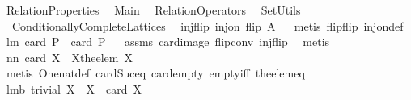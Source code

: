 %
\begin{isabellebody}%
\def\isabellecontext{RelationProperties}%
%
\isamarkuptrue%
%
\isadelimtheory
%
\endisadelimtheory
%
\isatagtheory
{}\isamarkupfalse%
\ RelationProperties\isanewline
{}\isanewline
\ \ Main\isanewline
\ \ RelationOperators\isanewline
\ \ SetUtils\isanewline
\ \ Conditionally{\isacharunderscore}Complete{\isacharunderscore}Lattices\ \isanewline
\isanewline
{}%
\endisatagtheory
{\isafoldtheory}%
%
\isadelimtheory
%
\endisadelimtheory
%
\isamarkuptrue%
\isamarkupfalse%
\ injflip{\isacharcolon}\ {\isachardoublequoteopen}inj{\isacharunderscore}on\ flip\ A{\isachardoublequoteclose}%
\isadelimproof
\ %
\endisadelimproof
%
\isatagproof
{}\isamarkupfalse%
\ {\isacharparenleft}metis\ flip{\isacharunderscore}flip\ inj{\isacharunderscore}on{\isacharunderscore}def{\isacharparenright}%
\endisatagproof
{\isafoldproof}%
%
\isadelimproof
%
\endisadelimproof
\isanewline
\isanewline
{}\isamarkupfalse%
\ lm{}{}{}{\isacharcolon}\ {\isachardoublequoteopen}card\ P\ {\isacharequal}\ card\ {\isacharparenleft}P{\isacharcircum}{\isacharminus}{}{\isacharparenright}{\isachardoublequoteclose}%
\isadelimproof
\ %
\endisadelimproof
%
\isatagproof
{}\isamarkupfalse%
\ assms\ card{\isacharunderscore}image\ flip{\isacharunderscore}conv\ injflip\ \isamarkupfalse%
\ metis%
\endisatagproof
{\isafoldproof}%
%
\isadelimproof
%
\endisadelimproof
\isanewline
\isanewline
{}\isamarkupfalse%
\ nn{}{}{\isacharcolon}\ {\isachardoublequoteopen}card\ X{\isacharequal}{}\ {\isacharequal}\ {\isacharparenleft}X{\isacharequal}{\isacharbraceleft}the{\isacharunderscore}elem\ X{\isacharbraceright}{\isacharparenright}{\isachardoublequoteclose}\ \isanewline
%
\isadelimproof
%
\endisadelimproof
%
\isatagproof
{}\isamarkupfalse%
\ {\isacharparenleft}metis\ One{\isacharunderscore}nat{\isacharunderscore}def\ card{\isacharunderscore}Suc{\isacharunderscore}eq\ card{\isacharunderscore}empty\ empty{\isacharunderscore}iff\ the{\isacharunderscore}elem{\isacharunderscore}eq{\isacharparenright}%
\endisatagproof
{\isafoldproof}%
%
\isadelimproof
\isanewline
%
\endisadelimproof
\isanewline
{}\isamarkupfalse%
\ lm{}{}{}b{\isacharcolon}\ {\isachardoublequoteopen}trivial\ X\ {\isacharequal}\ {\isacharparenleft}X{\isacharequal}{\isacharbraceleft}{\isacharbraceright}\ {\isasymor}\ card\ X{\isacharequal}{}{\isacharparenright}{\isachardoublequoteclose}%

\end{isabellebody}
